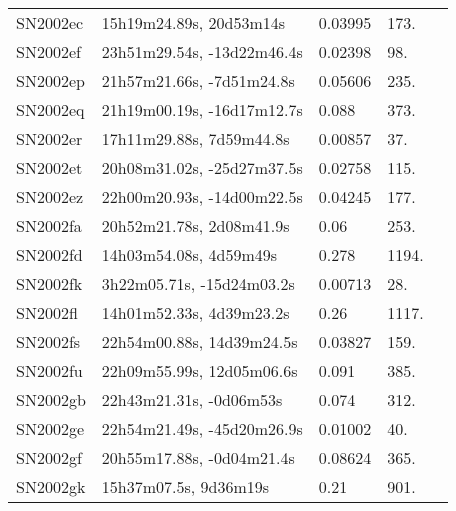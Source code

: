 \begin{longtable}{lllll}
         SN2002ec &        15h19m24.89s, 20d53m14s &  0.03995 &           173. &  \citet{1999AandAS..139..483B} \\
         SN2002ef &     23h51m29.54s, -13d22m46.4s &  0.02398 &            98. &    \citet{2003AJ....126.2268W} \\
         SN2002ep &      21h57m21.66s, -7d51m24.8s &  0.05606 &           235. &    \citet{2004AJ....128.1558S} \\
         SN2002eq &     21h19m00.19s, -16d17m12.7s &    0.088 &           373. &    \citet{2002IAUC.7968A...1H} \\
         SN2002er &       17h11m29.88s, 7d59m44.8s &  0.00857 &            37. &    \citet{1991RC3.9.C...0000d} \\
         SN2002et &     20h08m31.02s, -25d27m37.5s &  0.02758 &           115. &  \citet{2007AandA...465...71T} \\
         SN2002ez &     22h00m20.93s, -14d00m22.5s &  0.04245 &           177. &    \citet{20096dF...C...0000J} \\
         SN2002fa &       20h52m21.78s, 2d08m41.9s &     0.06 &           253. &    \citet{2002IAUC.7968A...1H} \\
         SN2002fd &         14h03m54.08s, 4d59m49s &    0.278 &          1194. &    \citet{2002IAUC.7971B...1Y} \\
         SN2002fk &      3h22m05.71s, -15d24m03.2s &  0.00713 &            28. &    \citet{2004AJ....128...16K} \\
         SN2002fl &       14h01m52.33s, 4d39m23.2s &     0.26 &          1117. &    \citet{2002IAUC.7977A...1R} \\
         SN2002fs &      22h54m00.88s, 14d39m24.5s &  0.03827 &           159. &    \citet{2004SDSS2.C...0000:} \\
         SN2002fu &      22h09m55.99s, 12d05m06.6s &    0.091 &           385. &    \citet{2002IAUC.7979A...1W} \\
         SN2002gb &        22h43m21.31s, -0d06m53s &    0.074 &           312. &    \citet{2002IAUC.7988A...1H} \\
         SN2002ge &     22h54m21.49s, -45d20m26.9s &  0.01002 &            40. &    \citet{2008ApJ...676..184T} \\
         SN2002gf &      20h55m17.88s, -0d04m21.4s &  0.08624 &           365. &    \citet{2004SDSS2.C...0000:} \\
         SN2002gk &          15h37m07.5s, 9d36m19s &     0.21 &           901. &    \citet{2002IAUC.7993A...1K} \\

\end{longtable}

